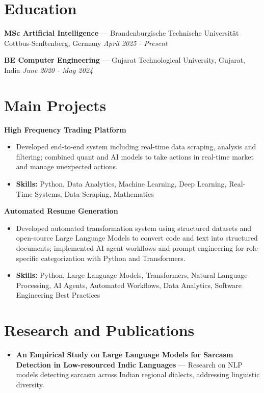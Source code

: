 \documentclass[a4paper,10pt]{article}
\begin{document}
\section*{Education}
\textbf{MSc Artificial Intelligence} — Brandenburgische Technische Universität Cottbus-Senftenberg, Germany \hfill \textit{April 2025 - Present}\par
\vspace{1.5pt}
\textbf{BE Computer Engineering} — Gujarat Technological University, Gujarat, India \hfill \textit{June 2020 - May 2024}\par

\section*{Main Projects}
\textbf{High Frequency Trading Platform}\par
\vspace{1pt}
\begin{itemize}
  \item Developed end-to-end system including real-time data scraping, analysis and filtering; combined quant and AI models to take actions in real-time market and manage unexpected actions.
  \item \textbf{Skills:} Python, Data Analytics, Machine Learning, Deep Learning, Real-Time Systems, Data Scraping, Mathematics
\end{itemize}
\vspace{3pt}
\textbf{Automated Resume Generation}\par
\vspace{1pt}
\begin{itemize}
  \item Developed automated transformation system using structured datasets and open-source Large Language Models to convert code and text into structured documents; implemented AI agent workflows and prompt engineering for role-specific categorization with Python and Transformers.
  \item \textbf{Skills:} Python, Large Language Models, Transformers, Natural Language Processing, AI Agents, Automated Workflows, Data Analytics, Software Engineering Best Practices
\end{itemize}

\section*{Research and Publications}
\begin{itemize}
\item \textbf{An Empirical Study on Large Language Models for Sarcasm Detection in Low-resourced Indic Languages} — Research on NLP models detecting sarcasm across Indian regional dialects, addressing linguistic diversity.
\end{itemize}
\end{document}
